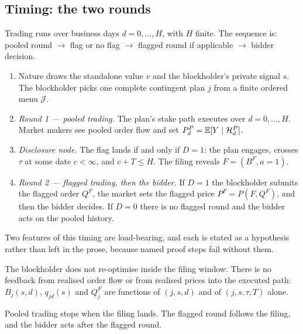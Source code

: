 \subsection{Timing: the two rounds}
\label{sec:timing}

Trading runs over business days $d = 0,\dots,H$, with $H$ finite. The sequence is: pooled round
$\to$ flag or no flag $\to$ flagged round if applicable $\to$ bidder decision.

\begin{enumerate}[label=(\arabic*),leftmargin=2.2em,itemsep=3pt]
\item Nature draws the standalone value $v$ and the blockholder's private signal $s$. The
  blockholder picks one complete contingent plan $j$ from a finite ordered menu $\mathcal J$.
\item \emph{Round 1 --- pooled trading.} The plan's stake path executes over $d = 0,\dots,H$. Market
  makers see pooled order flow and set $P_d^P = \mathbb{E}[Y \mid \mathcal H_d^P]$.
\item \emph{Disclosure node.} The flag lands if and only if $D = 1$: the plan engages, crosses
  $\tau$ at some date $c < \infty$, and $c + T \le H$. The filing reveals $F = (B^F, a = 1)$.
\item \emph{Round 2 --- flagged trading, then the bidder.} If $D = 1$ the blockholder submits the
  flagged order $Q^F$, the market sets the flagged price $P^F = P(F,Q^F)$, and then the bidder
  decides. If $D = 0$ there is no flagged round and the bidder acts on the pooled history.
\end{enumerate}

Two features of this timing are load-bearing, and each is stated as a hypothesis rather than left in
the prose, because named proof steps fail without them.

\begin{assumption}
\label{asm:nofeedback}
The blockholder does not re-optimise inside the filing window. There is no feedback from realised
order flow or from realised prices into the executed path: $B_j(s,d)$, $q_{jd}(s)$ and $Q_j^F$ are
functions of $(j,s,d)$ and of $(j,s,\tau,T)$ alone.
\end{assumption}

\begin{assumption}
\label{asm:flagterm}
Pooled trading stops when the filing lands. The flagged round follows the filing, and the bidder
acts after the flagged round.
\end{assumption}

